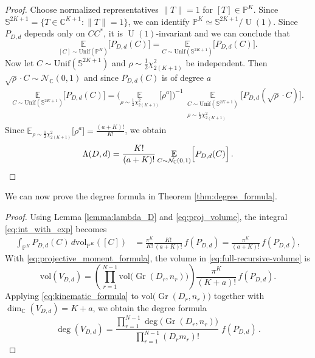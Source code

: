 \documentclass{article}
\theoremstyle{definition}
\DeclareMathOperator{\Gr}{Gr}
\DeclareMathOperator{\U}{U}
\newcommand{\C}{\mathbb{C}}
\newcommand{\vol}{\mathrm{vol}}
\renewcommand{\P}{\mathbb{P}}
\begin{document}
\begin{proof}
Choose normalized representatives $\|T\| =1$ for $[T]\in \P^K$. Since $\mathbb S^{2K+1}
=
\{T\in \mathbb C^{K+1}:\|T\|=1\}$, we can identify $\P^K \simeq \mathbb S^{2K+1} / \U(1)$. Since $P_{D,d}$ depends only on $CC^*$, it is $\U(1)$-invariant and we can conclude that 
\begin{equation*}
    \underset{[C] \sim \mathrm{Unif}(\P^K)}{\mathbb{E}}\Big[P_{D,d}(C)\Big] = \underset{C \sim \mathrm{Unif}(\mathbb S^{2K+1})}{\mathbb{E}}\Big[P_{D,d}(C)\Big].
\end{equation*}
Now let $C\sim \mathrm{Unif}(\mathbb S^{2K+1})$ and $\rho \sim \frac{1}{2}\chi^2_{2(K+1)}$ be independent. Then $\sqrt{\rho}\cdot C\sim\mathcal N_{\C}(0,1)$ and since $P_{D,d}(C)$ is of degree $a$
\begin{align*}
    \underset{C \sim \mathrm{Unif}(\mathbb S^{2K+1})}{\mathbb{E}}
    \Big[P_{D,d}(C)\Big] = \Big(\underset{\rho \sim \frac{1}{2}\chi^2_{2(K+1)}}{\mathbb{E}}\Big[\rho^a\Big]\Big)^{-1} \,\underset{\substack{C \sim \mathrm{Unif}(\mathbb S^{2K+1}) \\ \rho \sim \frac{1}{2}\chi^2_{2(K+1)}}}{\mathbb{E}}\Big[P_{D,d}(\sqrt{\rho}\cdot C)\Big].
\end{align*}
Since $\mathbb{E}_{\rho \sim \frac{1}{2}\chi^2_{2(K+1)}}\Big[\rho^a\Big] = \frac{(a + K)!}{K!}$, we obtain
\begin{equation*}
    \Lambda(D, d) = \frac{K!}{(a+K)!}\,\underset{C \sim \mathcal{N}_{\C}(0,1)}{\mathbb{E}}\Big[P_{D,d}(C)\Big]\,.   \qedhere
\end{equation*}
\end{proof}
\newpage
\noindent
We can now prove the degree formula in Theorem \ref{thm:degree_formula}.
\begin{proof}Using Lemma \ref{lemma:lambda_D} and \eqref{eq:proj_volume}, the integral \eqref{eq:int_with_exp} becomes
\begin{align}\label{eq:projective_moment_formula}
\int_{\P^K}P_{D,d}(C)\,d\vol_{\P^K}([C]) &= \frac{\pi^K}{K!}\frac{K!}{(a + K)!}\,f(P_{D,d}) = \frac{\pi^K}{(a + K)!}\,f(P_{D,d}),
\end{align}
With \eqref{eq:projective_moment_formula}, the volume in \eqref{eq:full-recursive-volume} is
\begin{equation}\label{eq:volume_formula_f_polynomial}
\vol(V_{D,d})
=
\left(\prod_{r=1}^{N-1}\vol\bigl(\Gr(D_r,n_r)\bigr)\right)
\frac{\pi^K}{(K+a)!}\,f(P_{D,d}).
\end{equation}
Applying  \eqref{eq:kinematic_formula} to $\vol\bigl(\Gr(D_r,n_r)\bigr)$ 
together with $\dim_\C(V_{D,d})=K+a$, we obtain the degree formula
\begin{equation}\label{eq:degree_formula_f_polynomial}
\deg(V_{D,d}) = 
\frac{
\displaystyle\prod_{r=1}^{N-1}
\deg\bigl(\Gr(D_r,n_r)\bigr)
}{
\displaystyle\prod_{r=1}^{N-1}(D_r m_r)!
}
\;f(P_{D,d})\, . 
\end{equation}
\end{proof}
\end{document}
